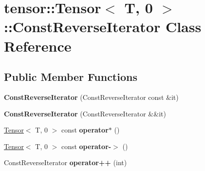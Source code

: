 \hypertarget{classtensor_1_1Tensor_3_01T_00_010_01_4_1_1ConstReverseIterator}{}\section{tensor\+:\+:Tensor$<$ T, 0 $>$\+:\+:Const\+Reverse\+Iterator Class Reference}
\label{classtensor_1_1Tensor_3_01T_00_010_01_4_1_1ConstReverseIterator}
\subsection*{Public Member Functions}
\begin{DoxyCompactItemize}
\item 
{\bfseries Const\+Reverse\+Iterator} (Const\+Reverse\+Iterator const \&it)\hypertarget{classtensor_1_1Tensor_3_01T_00_010_01_4_1_1ConstReverseIterator_a163b4f8d5b96b68098400c748a6299d0}{}\label{classtensor_1_1Tensor_3_01T_00_010_01_4_1_1ConstReverseIterator_a163b4f8d5b96b68098400c748a6299d0}

\item 
{\bfseries Const\+Reverse\+Iterator} (Const\+Reverse\+Iterator \&\&it)\hypertarget{classtensor_1_1Tensor_3_01T_00_010_01_4_1_1ConstReverseIterator_a157f0ce0c3022d9f5399345979c1bc1d}{}\label{classtensor_1_1Tensor_3_01T_00_010_01_4_1_1ConstReverseIterator_a157f0ce0c3022d9f5399345979c1bc1d}

\item 
\hyperlink{classtensor_1_1Tensor}{Tensor}$<$ T, 0 $>$ const {\bfseries operator$\ast$} ()\hypertarget{classtensor_1_1Tensor_3_01T_00_010_01_4_1_1ConstReverseIterator_a4b8003acef60bb38bc89fe1054d99fda}{}\label{classtensor_1_1Tensor_3_01T_00_010_01_4_1_1ConstReverseIterator_a4b8003acef60bb38bc89fe1054d99fda}

\item 
\hyperlink{classtensor_1_1Tensor}{Tensor}$<$ T, 0 $>$ const {\bfseries operator-\/$>$} ()\hypertarget{classtensor_1_1Tensor_3_01T_00_010_01_4_1_1ConstReverseIterator_a1ec3d3aee2e25217157ddced1b2be9f0}{}\label{classtensor_1_1Tensor_3_01T_00_010_01_4_1_1ConstReverseIterator_a1ec3d3aee2e25217157ddced1b2be9f0}

\item 
Const\+Reverse\+Iterator {\bfseries operator++} (int)\hypertarget{classtensor_1_1Tensor_3_01T_00_010_01_4_1_1ConstReverseIterator_a5fddceafbec29d9e6b0acbc3e77c6c53}{}\label{classtensor_1_1Tensor_3_01T_00_010_01_4_1_1ConstReverseIterator_a5fddceafbec29d9e6b0acbc3e77c6c53}


\end{DoxyCompactItemize}
